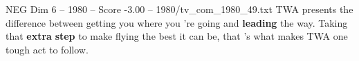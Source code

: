 \begin{textsample}{NEG Dim 6 – 1980 – Score -3.00 – 1980/tv\_com\_1980\_49.txt}  \label{ex:f6_neg_032}
TWA presents the difference between getting you where you 're going and \textbf{leading} the way.
Taking that \textbf{extra} \textbf{step} to make flying the best it can be, that 's what makes TWA one tough act to follow.

\end{textsample}
